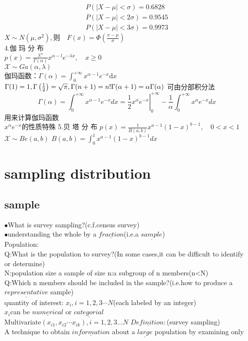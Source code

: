 \documentclass{report}
\begin{document}
$$
\begin{array}{l}{P(|X-\mu|<\sigma)=0.6828} \\ {P(|X-\mu|<2 \sigma)=0.9545} \\ {P(|X-\mu|<3 \sigma)=0.9973}\end{array}$$
$X \sim N\left(\mu, \sigma^{2}\right), 则 \quad F(x)=\Phi\left(\frac{x-\mu}{\sigma}\right)$\\
4.伽 玛 分 布\\
$p(x)=\frac{\lambda^{\alpha}}{\Gamma(\alpha)} x^{\alpha-l} e^{-\lambda x}, \quad x \geq 0$\\
$\mathcal{X} \sim G a(\alpha, \lambda)$\\
伽玛函数：$\Gamma(\alpha)=\int_{0}^{+\infty} x^{\alpha-1} e^{-x} \mathrm{d} x$ \\
$\Gamma(1)=1, \Gamma\left(\frac{1}{2}\right)=\sqrt{\pi},\Gamma(n+1)=n ! \\ \Gamma(\alpha+1)=\alpha \Gamma(\alpha)$
可由分部积分法$$\Gamma(\alpha)=\int_{0}^{+\infty} x^{\alpha-1} e^{-x} d x=\left.\frac{1}{2} x^{\alpha} e^{-x}\right|_{0} ^{+\infty}-\frac{1}{\alpha} \int_{0}^{+\infty} x^{\alpha} e^{-x} d x
$$
用来计算伽玛函数
\\$x^{\alpha} e^{-x}$的性质特殊
5.贝 塔 分 布
$p(x)=\frac{1}{B(a, b)} x^{a-1}(1-x)^{b-1}, \quad 0<x<1$
$\mathcal{X} \sim Be(a, b)$
$B(a, b)=\int_{0}^{1} x^{a-1}(1-x)^{b-1} d x$
\chapter{sampling distribution}
\section{sample}
\noindent$\bullet$What is survey sampling?(c.f.census survey)\\
$\bullet$understanding the whole by a $\underline{fraction}$(i.e.a $\underline{sample}$)
\\Population:\\
Q:What is the population to survey?(In some cases,it can be difficult to identify or determine)\\
N:population size
a sample of size n:a subgroup of n members(n<N)\\
Q:Which n members should be included in the sample?(i.e.how to produce a $\underline{representative}$ sample)\\
quantity of interest: 
$x_i,i=1,2,3\cdots N$(each labeled by an integer)\\
$x_i$can be $\underline{numerical}$ or $\underline{categorial}$
\\Multivariate$(x_{i1},x_{i2}\cdots x_{ik}),i=1,2,3 \dots N$
$\underline{Definition : }$(survey sampling)\\
A technique to obtain $\underline{information}$ about a $\underline{large}$ population by examining only
\end{document}
